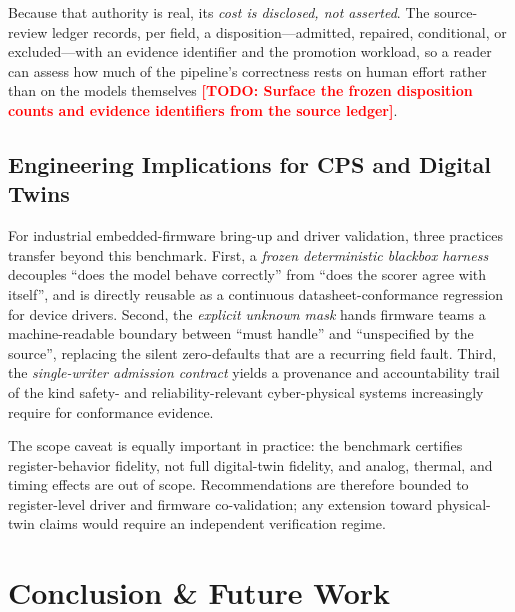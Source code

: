 \documentclass[preprint,review]{elsarticle}
\theoremstyle{definition}
\newcommand{\todo}[1]{\textcolor{red}{\textbf{[TODO: #1]}}}
\begin{document}
Because that authority is real, its \emph{cost is disclosed, not asserted}. The source-review
ledger records, per field, a disposition---admitted, repaired, conditional, or excluded---with
an evidence identifier and the promotion workload, so a reader can assess how much of the
pipeline's correctness rests on human effort rather than on the models themselves
\todo{Surface the frozen disposition counts and evidence identifiers from the source ledger}.

\subsection{Engineering Implications for CPS and Digital Twins}
\label{sec:implications}

For industrial embedded-firmware bring-up and driver validation, three practices transfer
beyond this benchmark. First, a \emph{frozen deterministic blackbox harness} decouples
``does the model behave correctly'' from ``does the scorer agree with itself'', and is
directly reusable as a continuous datasheet-conformance regression for device drivers.
Second, the \emph{explicit unknown mask} hands firmware teams a machine-readable boundary
between ``must handle'' and ``unspecified by the source'', replacing the silent zero-defaults
that are a recurring field fault. Third, the \emph{single-writer admission contract} yields a
provenance and accountability trail of the kind safety- and reliability-relevant
cyber-physical systems increasingly require for conformance evidence.

The scope caveat is equally important in practice: the benchmark certifies register-behavior
fidelity, not full digital-twin fidelity, and analog, thermal, and timing effects are out of
scope. Recommendations are therefore bounded to register-level driver and firmware
co-validation; any extension toward physical-twin claims would require an independent
verification regime.

\section{Conclusion \& Future Work}
\label{sec:conclusion}
\end{document}
